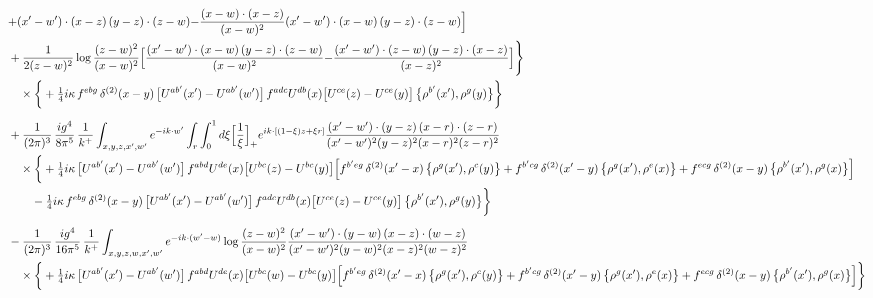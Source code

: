 \documentclass[10pt]{article}
\numberwithin{equation}{section}
\begin{document}
\begin{align}
&{+(x^{\prime}-w^{\prime})\cdot(x-z)\,(y-z)\cdot(z-w)}{-\frac{(x-w)\cdot(x-z)}{(x-w)^{2}}(x^{\prime}-w^{\prime})\cdot(x-w)\,(y-z)\cdot(z-w)}\Big]\notag\\
&+\frac{1}{2(z-w)^{2}}\log\frac{(z-w)^{2}}{(x-w)^{2}}\Big[{\frac{(x^{\prime}-w^{\prime})\cdot(x-w)\,(y-z)\cdot(z-w)}{(x-w)^{2}}}{-\frac{(x^{\prime}-w^{\prime})\cdot(z-w)\,(y-z)\cdot(x-z)}{(x-z)^{2}}}\Big]\Bigg\}\notag\\
&\quad\times\bigg\{+\tfrac14 i\kappa\,f^{ebg}\,\delta^{(2)}(x-y)\,\big[U^{ab^{\prime}}(x^{\prime})-U^{ab^{\prime}}(w^{\prime})\big]\,f^{adc}U^{db}(x)\big[U^{ce}(z)-U^{ce}(y)\big]\,\big\{\rho^{b^{\prime}}(x^{\prime}),\rho^{g}(y)\big\}\bigg\}\notag\\[6pt]
&+\frac{1}{(2\pi)^{3}}\,\frac{ig^{4}}{8\pi^{5}}\,\frac{1}{k^{+}}\int_{x,y,z,x^{\prime},w^{\prime}}e^{-ik\cdot w^{\prime}}\int_{r}\int_{0}^{1}d\xi\Big[\frac1\xi\Big]_{+}e^{ik\cdot[(1-\xi)z+\xi r]}\frac{(x^{\prime}-w^{\prime})\cdot(y-z)\,(x-r)\cdot(z-r)}{(x^{\prime}-w^{\prime})^{2}(y-z)^{2}(x-r)^{2}(z-r)^{2}}\notag\\
&\quad\times\bigg\{+\tfrac14 i\kappa\,\big[U^{ab^{\prime}}(x^{\prime})-U^{ab^{\prime}}(w^{\prime})\big]\,f^{abd}U^{de}(x)\big[U^{bc}(z)-U^{bc}(y)\big]\Big[f^{b^{\prime}eg}\,\delta^{(2)}(x^{\prime}-x)\,\big\{\rho^{g}(x^{\prime}),\rho^{c}(y)\big\}+f^{b^{\prime}cg}\,\delta^{(2)}(x^{\prime}-y)\,\big\{\rho^{g}(x^{\prime}),\rho^{e}(x)\big\}+f^{ecg}\,\delta^{(2)}(x-y)\,\big\{\rho^{b^{\prime}}(x^{\prime}),\rho^{g}(x)\big\}\Big]\notag\\
&\qquad-\tfrac14 i\kappa\,f^{ebg}\,\delta^{(2)}(x-y)\,\big[U^{ab^{\prime}}(x^{\prime})-U^{ab^{\prime}}(w^{\prime})\big]\,f^{adc}U^{db}(x)\big[U^{ce}(z)-U^{ce}(y)\big]\,\big\{\rho^{b^{\prime}}(x^{\prime}),\rho^{g}(y)\big\}\bigg\}\notag\\[6pt]
&-\frac{1}{(2\pi)^{3}}\,\frac{ig^{4}}{16\pi^{5}}\,\frac{1}{k^{+}}\int_{x,y,z,w,x^{\prime},w^{\prime}}e^{-ik\cdot(w^{\prime}-w)}\log\frac{(z-w)^{2}}{(x-w)^{2}}\frac{(x^{\prime}-w^{\prime})\cdot(y-w)\,(x-z)\cdot(w-z)}{(x^{\prime}-w^{\prime})^{2}(y-w)^{2}(x-z)^{2}(w-z)^{2}}\notag\\
&\quad\times\bigg\{+\tfrac14 i\kappa\,\big[U^{ab^{\prime}}(x^{\prime})-U^{ab^{\prime}}(w^{\prime})\big]\,f^{abd}U^{de}(x)\big[U^{bc}(w)-U^{bc}(y)\big]\Big[f^{b^{\prime}eg}\,\delta^{(2)}(x^{\prime}-x)\,\big\{\rho^{g}(x^{\prime}),\rho^{c}(y)\big\}+f^{b^{\prime}cg}\,\delta^{(2)}(x^{\prime}-y)\,\big\{\rho^{g}(x^{\prime}),\rho^{e}(x)\big\}+f^{ecg}\,\delta^{(2)}(x-y)\,\big\{\rho^{b^{\prime}}(x^{\prime}),\rho^{g}(x)\big\}\Big]\bigg\}\notag\\[6pt]

\end{align}
\end{document}
